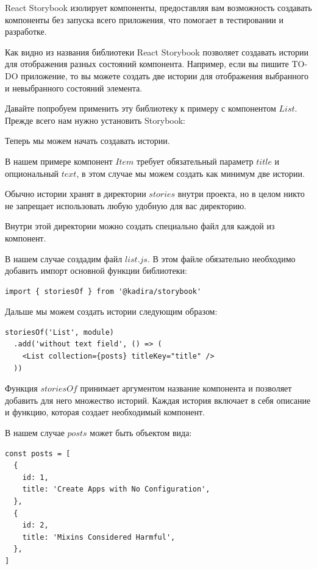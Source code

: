 React Storybook изолирует компоненты, предоставляя вам возможность создавать компоненты без запуска всего приложения, что помогает в тестировании и разработке.

Как видно из названия библиотеки React Storybook позволяет создавать истории для отображения разных состояний компонента. Например, если вы пишите TO-DO приложение, то вы можете создать две истории для отображения выбранного и невыбранного состояний элемента.

Давайте попробуем применить эту библиотеку к примеру с компонентом $List$. Прежде всего нам нужно установить Storybook:


Теперь мы можем начать создавать истории.

В нашем примере компонент $Item$ требует обязательный параметр $title$ и опциональный $text$, в этом случае мы можем создать как минимум две истории.

Обычно истории хранят в директории $stories$ внутри проекта, но в целом никто не запрещает использовать любую удобную для вас директорию.

Внутри этой директории можно создать специально файл для каждой из компонент.

В нашем случае создадим файл $list.js$. В этом файле обязательно необходимо добавить импорт основной функции библиотеки:

\begin{lstlisting}
import { storiesOf } from '@kadira/storybook'
\end{lstlisting}

Дальше мы можем создать истории следующим образом:

\begin{lstlisting}
storiesOf('List', module)
  .add('without text field', () => (
    <List collection={posts} titleKey="title" />
  ))
\end{lstlisting}

Функция $storiesOf$ принимает аргументом название компонента и позволяет добавить для него множество историй. Каждая история включает в себя описание и функцию, которая создает необходимый компонент.

В нашем случае $posts$ может быть объектом вида:

\begin{lstlisting}
const posts = [
  {
    id: 1,
    title: 'Create Apps with No Configuration',
  },
  {
    id: 2,
    title: 'Mixins Considered Harmful',
  },
]
\end{lstlisting}

